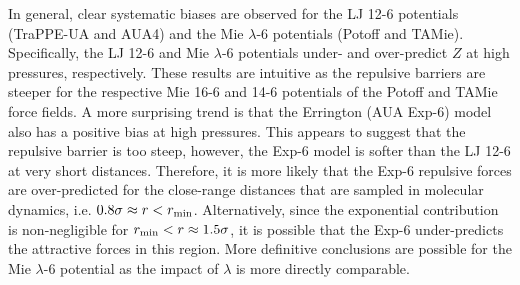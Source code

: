 \documentclass[journal=jctc,manuscript=article]{achemso}
\begin{document}


 
In general, 
clear systematic biases are observed for the LJ 12-6 potentials (TraPPE-UA and AUA4) and the Mie $\lambda$-6 potentials (Potoff and TAMie). Specifically, the LJ 12-6 and Mie $\lambda$-6 potentials under- and over-predict $Z$ at high pressures, respectively. These results are intuitive as the repulsive barriers are steeper for the respective Mie 16-6 and 14-6 potentials of the Potoff and TAMie force fields. A more surprising trend is that the Errington (AUA Exp-6) model also has a positive bias at high pressures. This appears to suggest that the repulsive barrier is too steep, however, the Exp-6 model is softer than the LJ 12-6 at very short distances. Therefore, it is more likely that the Exp-6 repulsive forces are over-predicted for the close-range distances that are sampled in molecular dynamics, i.e. $0.8 \sigma \approx r < r_{\rm min}$. Alternatively, since the exponential contribution is non-negligible for $r_{\rm min} < r \approx 1.5 \sigma$, it is possible that the Exp-6 under-predicts the attractive forces in this region. More definitive conclusions are possible for the Mie $\lambda$-6 potential as the impact of $\lambda$ is more directly comparable.


\end{document}
